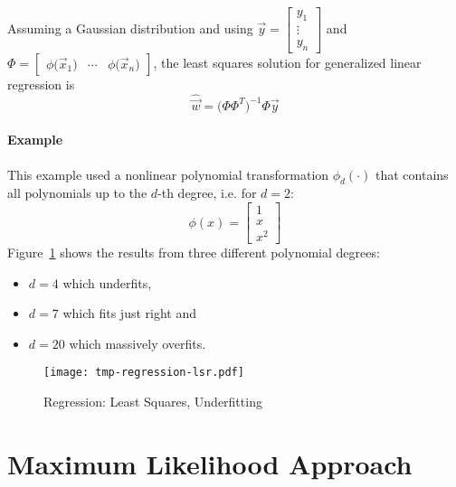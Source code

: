 		Assuming a Gaussian distribution and using \( \vec{y} = \begin{bmatrix} y_1 \\ \vdots \\ y_n \end{bmatrix} \) and \( \Phi = \begin{bmatrix} \phi\big(\vec{x}_1\big) & \cdots & \phi\big(\vec{x}_n\big) \end{bmatrix} \), the least squares solution for generalized linear regression is
		\begin{equation}
			\hat{\vec{w}} = \big( \Phi \Phi^T \big)^{-1} \Phi \vec{y}
		\end{equation}
		
		\paragraph{Example}
			This example used a nonlinear polynomial transformation \( \phi_d(\cdot) \) that contains all polynomials up to the \(d\)-th degree, i.e. for \( d = 2 \):
			\begin{equation}
				\phi(x) =
					\begin{bmatrix}
						1 \\
						x \\
						x^2
					\end{bmatrix}
			\end{equation}
			Figure~\ref{fig:regressionLsr} shows the results from three different polynomial degrees:
			\begin{itemize}
				\item \(d = 4\) which underfits,
				\item \(d = 7\) which fits just right and
				\item \(d = 20\) which massively overfits.
			\end{itemize}
		
			\begin{figure}
				\centering
				\texttt{[image: tmp-regression-lsr.pdf]}
				\caption{Regression: Least Squares, Underfitting}
				\label{fig:regressionLsr}
			\end{figure}

	\section{Maximum Likelihood Approach}
